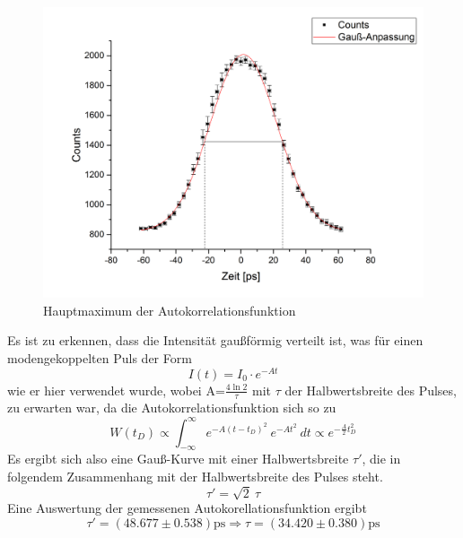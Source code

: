 \begin{figure}[H]
	\begin{center}
		\includegraphics[scale=.5]{Bilder/Autokorr2.png}
		\caption{Hauptmaximum der Autokorrelationsfunktion}
		\label{aut2}
	\end{center}
\end{figure}
Es ist zu erkennen, dass die Intensität gaußförmig verteilt ist, was für einen modengekoppelten Puls der Form
\begin{equation*}
I(t)=I_0\cdot e^{-At}
\end{equation*}
wie er hier verwendet wurde, wobei A=$\frac{4\ln2}{\tau}$ mit $\tau$ der Halbwertsbreite des Pulses, zu erwarten war, da die Autokorrelationsfunktion sich so zu 
\begin{equation*}
W(t_D)\propto\int_{-\infty}^{\infty}e^{-A(t-t_D)^2}\:e^{-At^2}\:dt\propto e^{-\frac{A}{2}t_D^2}
\end{equation*}
Es ergibt sich also eine Gauß-Kurve mit einer Halbwertsbreite $\tau'$, die in folgendem Zusammenhang mit der Halbwertsbreite des Pulses steht.
\begin{equation}
\tau'=\sqrt{2}\:\tau
\end{equation}
Eine Auswertung der gemessenen Autokorellationsfunktion ergibt 
\begin{equation}
\tau'=(48.677\pm0.538)\text{ps}\Longrightarrow\tau=(34.420\pm0.380)\text{ps}
\end{equation}
